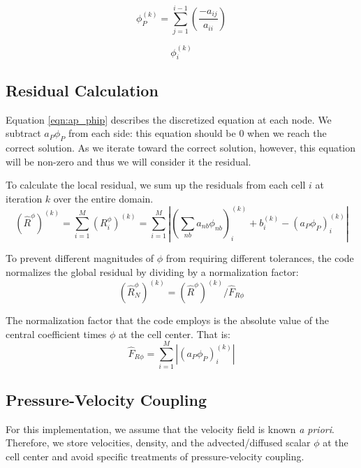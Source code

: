 \documentclass{article}
\newcommand{\lp}{\left(}
\newcommand{\rp}{\right)}
\begin{document}
\begin{equation}
    \phi_P^{\lp k \rp} = \sum_{j=1}^{i-1} \lp \frac{-a_{ij}}{a_{ii}} \rp
\end{equation}



\begin{equation}
    \phi_i^{\lp k \rp}
\end{equation}


\subsection{Residual Calculation}

Equation \ref{eqn:ap_phip} describes the discretized equation at each node. We subtract $a_P\phi_P$ from each side: this equation should be 0 when we reach the correct solution. As we iterate toward the correct solution, however, this equation will be non-zero and thus we will consider it the residual. 

To calculate the local residual, we sum up the residuals from each cell $i$ at iteration $k$ over the entire domain.
\begin{equation}
    \lp \hat{R}^{\phi} \rp^{\lp k\rp} = \sum_{i=1}^M \lp R_i^{\phi}\rp^{\lp k \rp} = \sum_{i=1}^M \left|\lp \sum_{nb}a_{nb}\phi_{nb} \rp_i^{\lp k \rp} + b_i^{\lp k \rp} - \lp a_P\phi_P \rp_i^{\lp k \rp} \right|
    \label{eqn:resid_local}
\end{equation}

To prevent different magnitudes of $\phi$ from requiring different tolerances, the code normalizes the global residual by dividing by a normalization factor:
\begin{equation}
    \lp \hat{R}_N^{\phi} \rp^{\lp k\rp} = \lp \hat{R}^{\phi} \rp^{\lp k\rp}/ \hat{F}_{R\phi}
\end{equation}

The normalization factor that the code employs is the absolute value of the central coefficient times $\phi$ at the cell center. That is:
\begin{equation}
    \hat{F}_{R\phi} = \sum_{i=1}^M \left|\lp a_P\phi_P \rp_i^{\lp k \rp} \right|
\end{equation}

\subsection{Pressure-Velocity Coupling}
For this implementation, we assume that the velocity field is known \textit{a priori}. Therefore, we store velocities, density, and the advected/diffused scalar $\phi$ at the cell center and avoid specific treatments of pressure-velocity coupling.
\end{document}
